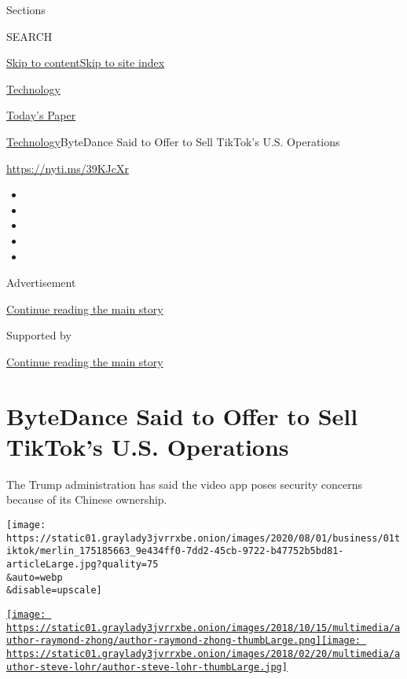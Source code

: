 Sections

SEARCH

\protect\hyperlink{site-content}{Skip to
content}\protect\hyperlink{site-index}{Skip to site index}

\href{https://www.nytimes3xbfgragh.onion/section/technology}{Technology}

\href{https://myaccount.nytimes3xbfgragh.onion/auth/login?response_type=cookie\&client_id=vi}{}

\href{https://www.nytimes3xbfgragh.onion/section/todayspaper}{Today's
Paper}

\href{/section/technology}{Technology}\textbar{}ByteDance Said to Offer
to Sell TikTok's U.S. Operations

\url{https://nyti.ms/39KJcXr}

\begin{itemize}
\item
\item
\item
\item
\item
\end{itemize}

Advertisement

\protect\hyperlink{after-top}{Continue reading the main story}

Supported by

\protect\hyperlink{after-sponsor}{Continue reading the main story}

\hypertarget{bytedance-said-to-offer-to-sell-tiktoks-us-operations}{%
\section{ByteDance Said to Offer to Sell TikTok's U.S.
Operations}\label{bytedance-said-to-offer-to-sell-tiktoks-us-operations}}

The Trump administration has said the video app poses security concerns
because of its Chinese ownership.

\texttt{[image: https://static01.graylady3jvrrxbe.onion/images/2020/08/01/business/01tiktok/merlin\_175185663\_9e434ff0-7dd2-45cb-9722-b47752b5bd81-articleLarge.jpg?quality=75\\\&auto=webp\\\&disable=upscale]}

\href{https://www.nytimes3xbfgragh.onion/by/raymond-zhong}{\texttt{[image: https://static01.graylady3jvrrxbe.onion/images/2018/10/15/multimedia/author-raymond-zhong/author-raymond-zhong-thumbLarge.png]}}\href{https://www.nytimes3xbfgragh.onion/by/steve-lohr}{\texttt{[image: https://static01.graylady3jvrrxbe.onion/images/2018/02/20/multimedia/author-steve-lohr/author-steve-lohr-thumbLarge.jpg]}}

